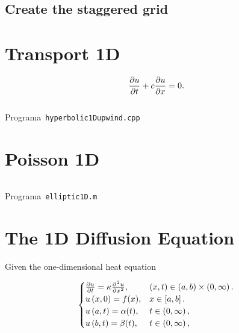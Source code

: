 \documentclass[a4paper,abstract=true]{scrreprt}
\begin{document}
\subsection{Create the staggered grid}

\section{Transport 1D}

\begin{equation*}
	\diffp{u}{t}+c\diffp{u}{x}=
	0.
\end{equation*}

\begin{listing}[ht!]
	\tiny
	\centering
	\inputminted[frame=single,framesep=10pt,linenos,firstline=9,lastline=35,highlightlines={9}]{cpp}{../examples/cpp/hyperbolic1D_upwind.cpp}
	\caption{Programa~\texttt{hyperbolic1Dupwind.cpp}}
	\label{code:hyperbolic1Dupwind.cpp}
\end{listing}

\section{Poisson 1D}

\begin{listing}[ht!]
	\tiny
	\centering
	\inputminted[frame=single,framesep=10pt,linenos,firstline=1,lastline=53,highlightlines={21,29}]{octave}{../examples/octave/elliptic1D.m}
	\caption{Programa~\texttt{elliptic1D.m}}
	\label{code:elliptic1D.m}
\end{listing}

\section{The 1D Diffusion Equation}

Given the one-dimensional heat equation

\begin{equation}\label{eq:IBVPheat1d}
	\begin{cases}
		\diffp{u}{t}=
		\kappa\diffp[2]{u}{x},
		                              & \left(x,t\right)\in
		\left(a,b \right)\times\left(0, \infty \right).     \\
		u\left(x,0\right)=f(x),
		                              & x\in
		\left[a,b\right].                                   \\
		u\left(a,t\right)= \alpha(t), & t\in
		\left(0,\infty\right),                              \\
		u\left(b,t\right)= \beta(t),
		                              & t\in
		\left(0,\infty\right),
	\end{cases}
\end{equation}
\end{document}
